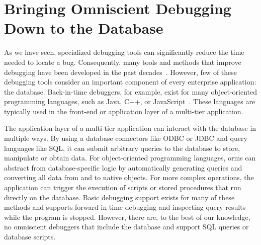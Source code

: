 \chapter{Bringing Omniscient Debugging Down to the Database}

\newcommand{\tool}{TAR\-DISP}
\newcommand{\SQLextension}{Back-in-time SQL}

As we have seen, specialized debugging tools can significantly reduce the time needed to locate a bug.
Consequently, many tools and methods that improve debugging have been developed in the past decades~\cite{wong16:a_survey_on_software}.
However, few of these debugging tools consider an important component of every enterprise application: the database.
Back-in-time debuggers, for example, exist for many object-oriented programming languages, such as Java, C++, or JavaScript~\cite{feldman88:igor_a_system,lewis03:debugging_backwards_in_time,barr16:time-travel_debugging_for_javascriptnode,wong16:a_survey_on_software}.
These languages are typically used in the front-end or application layer of a multi-tier application.



The application layer of a multi-tier application can interact with the database in multiple ways.
By using a database connectors like ODBC or JDBC and query languages like SQL, it can submit arbitrary queries to the database to store, manipulate or obtain data.
For object-oriented programming languages, \acp{orm} can abstract from database-specific logic by automatically generating queries and converting all data from and to native objects.
For more complex operations, the application can trigger the execution of scripts or stored procedures that run directly on the database.
Basic debugging support exists for many of these methods and supports forward-in-time debugging and inspecting query results while the program is stopped.
However, there are, to the best of our knowledge, no omniscient debuggers that include the database and support SQL queries or database scripts.

